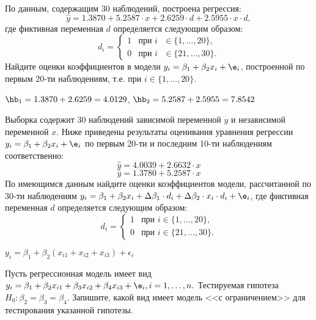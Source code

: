 \documentclass[pdftex,11pt,openany]{book}\usepackage[]{graphicx}\usepackage[]{color}
\begin{document}
\begin{solution} 
\end{solution}


\begin{problem}
 По данным, содержащим 30 наблюдений, построена регрессия:
\[
\hat{y}=1.3870+5.2587\cdot{x}+2.6259\cdot{d}+2.5955 \cdot{x} \cdot{d},
\]
где фиктивная переменная $d$ определяется следующим образом:
\[
d_i =
  \begin{cases}
    1 & \text{при $i$ $\in \bigl\{ 1,\dots,20 \bigr\} $}, \\
    0 & \text{при $i$ $\in \bigl\{ 21,\dots,30 \bigr\} $}. 
 \end{cases}
\]
Найдите оценки коэффициентов в модели $y_i=\beta_1+\beta_2 x_i+\e_i$, построенной по первым 20-ти наблюдениям, т.е. при $i \in \bigl\{1,\dots,20 \bigr\}$.
\end{problem}

\begin{solution}
$\hb_1=1.3870+2.6259=4.0129$, $\hb_2=5.2587+2.5955=7.8542$
\end{solution}


\begin{problem} %
 Выборка содержит 30 наблюдений зависимой переменной $y$ и независимой переменной $x$. Ниже приведены результаты оценивания уравнения регрессии $y_i=\beta_1+\beta_2 x_i+\e_i$ по первым 20-ти и последним 10-ти наблюдениям соответственно:
\[
\hat{y}=4.0039+2.6632\cdot{x}
\]
\[
\hat{y}=1.3780+5.2587\cdot{x}
\]
По имеющимся данным найдите оценки коэффициентов  модели, рассчитанной по 30-ти наблюдениям $y_i=\beta_1+\beta_2 x_i+\Delta{\beta_1} \cdot{d_i} + \Delta{\beta_2} \cdot{x_i} \cdot{d_i}+\e_i$, где фиктивная переменная $d$ определяется следующим образом:
\[
d_i =
  \begin{cases}
    1 & \text{при } i \in \bigl\{ 1,\dots,20 \bigr\} , \\
    0 & \text{при } i \in \bigl\{ 21,\dots,30 \bigr\} . 
 \end{cases}
\]
\end{problem}

\begin{solution}
$y_i=\beta_1+\beta_2(x_{i1}+x_{i2}+x_{i3})+\epsilon_{i}$
\end{solution}


\begin{problem} %
 Пусть регрессионная модель имеет вид $y_i=\beta_1+\beta_2 x_{i1}+\beta_3 x_{i2}+\beta_4 x_{i3}+\e_i, i=1,\dots,n.$ Тестируемая гипотеза $H_0: \beta_2=\beta_3=\beta_4.$ Запишите, какой вид имеет модель <<с ограничением>> для тестирования указанной гипотезы.
\end{problem}
\end{document}
